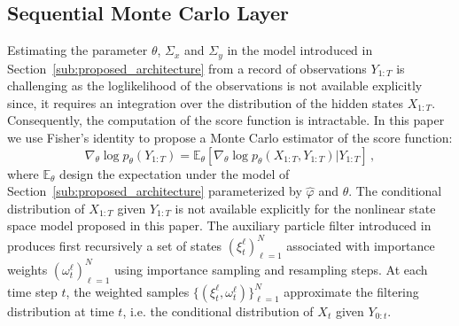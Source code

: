 \documentclass{article}
\begin{document}
\subsection{Sequential Monte Carlo Layer}%
\label{sub:uncertainty_estimation}

Estimating the parameter $\theta$, $\Sigma_x$ and $\Sigma_y$ in the model introduced in Section~\ref{sub:proposed_architecture} from a record of observations $Y_{1:T}$ is challenging as the loglikelihood of the observations is not available explicitly since, it requires an integration over the distribution of the hidden states $X_{1:T}$. Consequently, the computation of the score function is intractable.
In this paper we use Fisher's identity to propose a Monte Carlo estimator of the score function:
\begin{equation}
	\nabla_\theta \log p_\theta(Y_{1:T}) = \mathbb{E}_\theta \left[ \nabla_\theta\log p_\theta(X_{1:T}, Y_{1:T}) | Y_{1:T} \right]\,,
	\label{eq:grad_ll}
\end{equation}
where $\mathbb{E}_\theta$ design the expectation under the model of Section~\ref{sub:proposed_architecture} parameterized by $\widehat \varphi$ and $\theta$. The conditional distribution of $X_{1:T}$ given $Y_{1:T}$ is not available explicitly for the nonlinear state space model proposed in this paper. %
The auxiliary particle filter introduced in \cite{Jun1998} produces first recursively a set of states $(\xi^{\ell}_t)_{\ell=1}^N$ associated with importance weights $(\omega^{\ell}_t)_{\ell=1}^N$ using importance sampling and resampling steps.
At each time step $t$, the weighted samples $\{(\xi^{\ell}_t,\omega^{\ell}_t)\}_{\ell=1}^N$ approximate the filtering distribution at time $t$, i.e. the conditional distribution of $X_t$ given $Y_{0:t}$.
\end{document}

